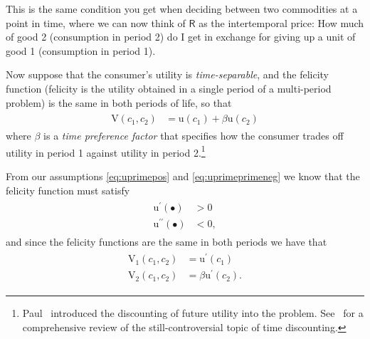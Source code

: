 \documentclass{scrartcl}
\begin{document}
  This is the same condition you get when deciding between two commodities at a point in time, where we can now think of $\mathsf{R}$ as the intertemporal price: How much of good 2 (consumption in period 2) do I get in exchange for giving up a unit of good 1 (consumption in period 1).

  Now suppose that the consumer's utility is \textit{time-separable}, and the felicity function (felicity is the utility obtained in a single period of a multi-period problem) is the same in both periods of life, so that
  \begin{equation}\begin{gathered}\begin{aligned} \mathrm{V}(\boldsymbol{\mathit{c}}_{1},\boldsymbol{\mathit{c}}_{2}) & = \mathrm{u}(\boldsymbol{\mathit{c}}_{1})+\beta \mathrm{u}(\boldsymbol{\mathit{c}}_{2})
      \end{aligned}\end{gathered}\end{equation} where $\beta$ is a \textit{time preference factor} that specifies how the consumer trades off utility in period 1 against utility in period 2.\footnote{Paul~\cite{samuelson1937note,samuelsonOLG} introduced the discounting of future utility into the problem.  See~\cite{floDiscFacing} for a comprehensive review of the still-controversial topic of time discounting.}

  From our assumptions \eqref{eq:uprimepos} and \eqref{eq:uprimeprimeneg} we know that the felicity function must satisfy
  \begin{equation}\begin{gathered}\begin{aligned} \mathrm{u}^{\prime}(\bullet) & > 0 \\ \mathrm{u}^{\prime\prime}(\bullet) & < 0,
      \end{aligned}\end{gathered}\end{equation} and since the felicity functions are the same in both periods we have that
  \begin{equation}\begin{gathered}\begin{aligned} \mathrm{V}_{1}(\boldsymbol{\mathit{c}}_{1},\boldsymbol{\mathit{c}}_{2}) & = \mathrm{u}^{\prime}(\boldsymbol{\mathit{c}}_{1}) \\ \mathrm{V}_{2}(\boldsymbol{\mathit{c}}_{1},\boldsymbol{\mathit{c}}_{2}) & = \beta \mathrm{u}^{\prime}(\boldsymbol{\mathit{c}}_{2}).
      \end{aligned}\end{gathered}\end{equation}
\end{document}
